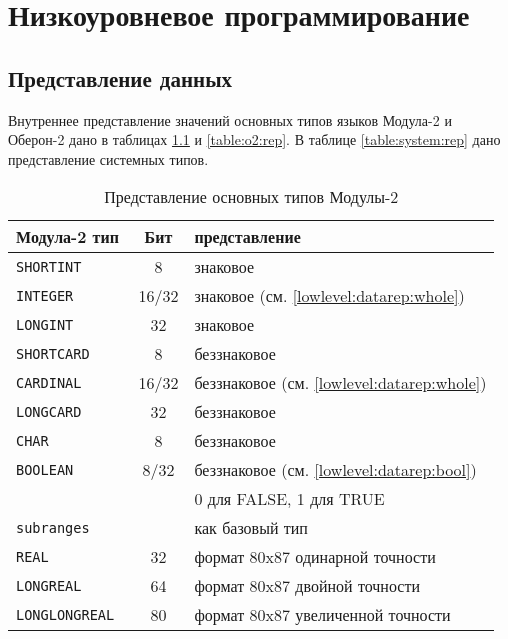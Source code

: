 \chapter{Низкоуровневое программирование}\label{lowlevel}

\section{Представление данных}\label{lowlevel:datarep}

Внутреннее представление значений основных типов языков
Модула-2 и Оберон-2 дано в таблицах
\ref{table:m2:rep} и \ref{table:o2:rep}. 
В таблице \ref{table:system:rep} дано представление системных типов.

\begin{table}
\begin{tabular}{|l|c|l|} \hline
\bf Модула-2  тип  & \bf Бит &\bf представление \\ \hline
\tt SHORTINT       & 8     & знаковое \\
\tt INTEGER        & 16/32 & знаковое (см. \ref{lowlevel:datarep:whole})\\
\tt LONGINT        & 32    & знаковое \\
\tt SHORTCARD      & 8     & беззнаковое \\
\tt CARDINAL       & 16/32 & беззнаковое (см. \ref{lowlevel:datarep:whole})\\
\tt LONGCARD       & 32    & беззнаковое \\
\tt CHAR           & 8     & беззнаковое \\
\tt BOOLEAN        & 8/32  & беззнаковое (см. \ref{lowlevel:datarep:bool})\\
                   &       & 0 для FALSE, 1 для TRUE \\
\tt subranges      &       & как базовый тип \\
\tt REAL           & 32    & формат 80x87 одинарной точности \\
\tt LONGREAL       & 64    & формат 80x87 двойной точности \\
\tt LONGLONGREAL   & 80    & формат 80x87 увеличенной точности \\
\hline
\end{tabular}
\caption{Представление основных типов Модулы-2}\label{table:m2:rep}
\end{table}

